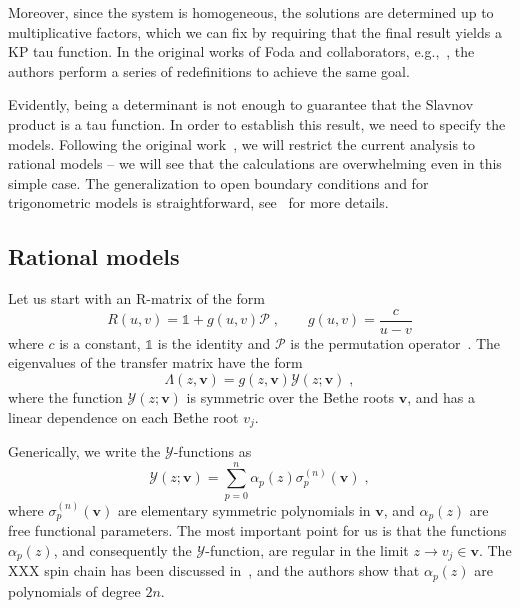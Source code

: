 \documentclass[a4paper,12pt]{amsart}
\begin{document}
Moreover, since the system is homogeneous, the solutions are
determined up to multiplicative factors, which we can fix by
requiring that the final result yields a KP tau function. In the
original works of Foda and collaborators, e.g.,~\cite{Foda:2009zz,
  Wheeler:2010vmq}, the authors perform a series of redefinitions to
achieve the same goal.

Evidently, being a determinant is not enough to guarantee that the
Slavnov product is a tau function.  In order to establish this
result, we need to specify the models. Following the original
work~\cite{Belliard:2019bfz}, we will restrict the current analysis to rational models
-- we will see that the calculations are overwhelming even in this
simple case. The generalization to open boundary conditions and for
trigonometric models is straightforward, see~\cite{Slavnov:2019aba} for more
details.

\subsection{Rational models}

Let us start with an R-matrix of the form
\begin{equation}
  R(u,v) = \mathbb{1} + g(u,v) \mathcal{P}\; , \qquad
  g(u,v) = \frac{c}{u - v}
\end{equation}
where \(c\) is a constant, \(\mathbb{1}\) is the identity and
\(\mathcal{P}\) is the permutation operator~\cite{Slavnov:2019aba}.
The eigenvalues of the transfer matrix have the form
\begin{equation}
  \Lambda(z, \bm{v}) = g(z, \bm{v}) \mathcal{Y}(z; \bm{v})\; ,
\end{equation}
where the function \(\mathcal{Y}(z; \bm{v})\) is symmetric over the
Bethe roots \(\bm{v}\), and has a linear dependence on each Bethe root
\(v_j\).

Generically, we write the \(\mathcal{Y}\)-functions as 
\begin{equation}
  \mathcal{Y}(z; \bm{v}) = \sum_{p=0}^n \alpha_p(z) \sigma_p^{(n)}(\bm{v})\; , 
\end{equation}
where \(\sigma_p^{(n)}(\bm{v})\) are elementary symmetric polynomials
in \(\bm{v}\), and \(\alpha_p(z)\) are free functional parameters.
The most important point for us is that the functions \(\alpha_p(z)\), 
and consequently the \(\mathcal{Y}\)-function, are regular in the limit
\(z \to v_j \in \bm{v}\). The XXX spin chain has been discussed
in~\cite{Belliard:2019bfz}, and the authors show that \(\alpha_p(z)\)
are polynomials of degree \(2n\).
\end{document}
